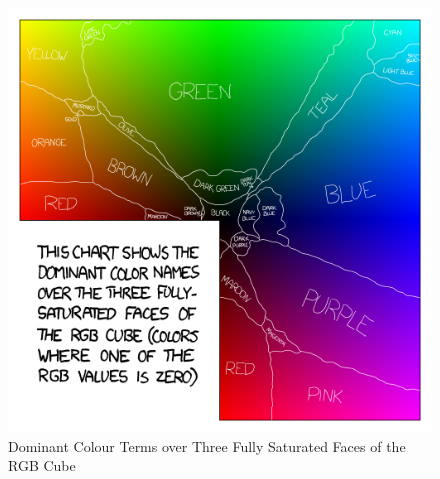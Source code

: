 \begin{figure}[!hbt]\centering
\includegraphics[width=.6\textwidth]{image/general/xkcd.png}
\caption{Dominant Colour Terms over Three Fully Saturated Faces of the RGB Cube}
\label{fig:xkcd}
\end{figure}


